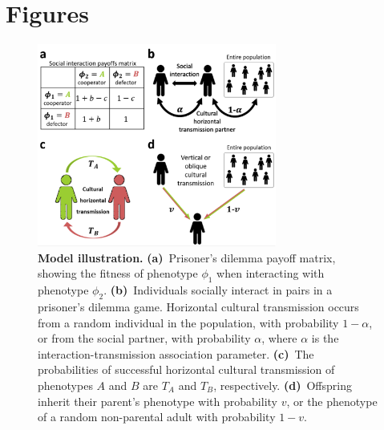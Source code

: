 \documentclass[12pt]{extarticle}
\begin{document}
{\newpage


\section*{Figures}
\begin{figure}[h]
  \centering
  \includegraphics[width=0.7\textwidth]{Illustration.pdf}
  \caption{\textbf{Model illustration.} 
  \textbf{(a)}~Prisoner's dilemma payoff matrix, showing the fitness of phenotype $\phi_1$ when interacting with phenotype $\phi_2$.
  \textbf{(b)}~Individuals socially interact in pairs in a prisoner's dilemma game. Horizontal cultural transmission occurs from a random individual in the population, with probability $1-\alpha$, or from the social partner, with probability $\alpha$, where $\alpha$ is the interaction-transmission association parameter.
  \textbf{(c)}~The probabilities of successful horizontal  cultural transmission of phenotypes $A$ and $B$ are $T_A$ and $T_B$, respectively.
  \textbf{(d)}~Offspring inherit their parent's phenotype with probability $v$, or the phenotype of a random non-parental adult with probability $1-v$.
    }
  \label{fig:illustration}
\end{figure}




}
\end{document}
